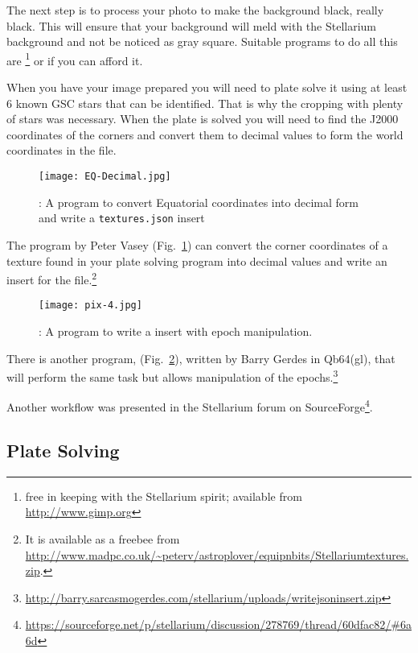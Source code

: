 The next step is to process your photo to make the background
black, really black. This will ensure that your background will meld with the
Stellarium background and not be noticed as gray square. Suitable programs to do all
this are \footnote{free in keeping with the Stellarium spirit; available from \url{http://www.gimp.org}} or
 if you can afford it.

When you have your image prepared you will need to plate solve it using
at least 6 known GSC stars that can be identified. That is why the
cropping with plenty of stars was necessary. When the plate is solved
you will need to find the J2000 coordinates of the corners and convert
them to decimal values to form the world coordinates in the
 file.

\begin{figure}[tb]
\centering\texttt{[image: EQ-Decimal.jpg]}
\caption{: A program to convert Equatorial coordinates into decimal
form and write a \texttt{textures.json} insert}
\label{fig:dso:STGen}
\end{figure}

The program  by Peter Vasey (Fig.~\ref{fig:dso:STGen}) can convert the corner coordinates of a
texture found in your plate solving program into decimal values and write an
insert for the  file.\footnote{It is available as a freebee
from
\url{http://www.madpc.co.uk/~peterv/astroplover/equipnbits/Stellariumtextures.zip}.}

\begin{figure}[t]
\centering\texttt{[image: pix-4.jpg]}
\caption{: A program to write a  insert with epoch manipulation.}
\label{fig:dso:ReadDSS}
\end{figure}

There is another program,  (Fig.~\ref{fig:dso:ReadDSS}), written by Barry Gerdes in Qb64(gl), that will perform the same
task but allows manipulation of the epochs.\footnote{
\url{http://barry.sarcasmogerdes.com/stellarium/uploads/writejsoninsert.zip}}

Another workflow was presented in the Stellarium forum on
SourceForge\footnote{\url{https://sourceforge.net/p/stellarium/discussion/278769/thread/60dfac82/#6a6d}}.

\subsection{Plate Solving}%
\label{sec:dso:plateSolving}

